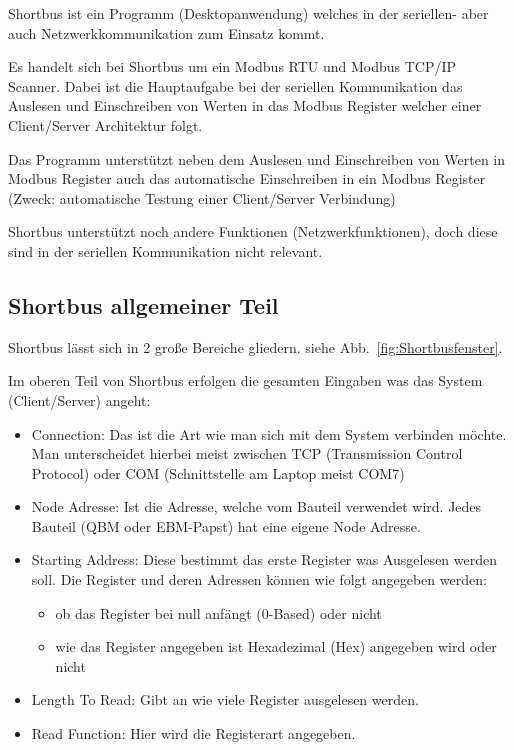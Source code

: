 Shortbus ist ein Programm (Desktopanwendung) welches in der seriellen- aber auch Netzwerkkommunikation zum Einsatz kommt. 

Es handelt sich bei Shortbus um ein Modbus RTU und Modbus TCP/IP Scanner.
Dabei ist die Hauptaufgabe bei der seriellen Kommunikation das Auslesen und Einschreiben von Werten in das Modbus Register welcher einer Client/Server Architektur folgt.


Das Programm unterstützt neben dem Auslesen und Einschreiben von Werten in Modbus Register auch das  automatische Einschreiben in ein Modbus Register (Zweck: automatische Testung einer Client/Server Verbindung)

Shortbus unterstützt noch andere Funktionen (Netzwerkfunktionen), doch diese sind in der seriellen Kommunikation nicht relevant. 
\cite[vgl.][]{software.informer:2024}

\subsection{Shortbus allgemeiner Teil}
Shortbus lässt sich in 2 große Bereiche gliedern. siehe Abb.~\ref{fig:Shortbusfenster}. 

Im oberen Teil von Shortbus erfolgen die gesamten Eingaben was das System (Client/Server) angeht:
\begin{itemize}
	\item Connection: Das ist die Art wie man sich mit dem System verbinden möchte. Man unterscheidet hierbei meist zwischen TCP (Transmission Control Protocol) oder COM (Schnittstelle am Laptop meist COM7)
	
	\item Node Adresse: Ist die Adresse, welche vom Bauteil verwendet wird. Jedes Bauteil (\zB QBM oder EBM-Papst) hat eine eigene Node Adresse.
	
	\item Starting Address: Diese bestimmt das erste Register was Ausgelesen werden soll. Die Register und deren Adressen können wie folgt angegeben werden:
		\begin{itemize}
			\item ob das Register bei null anfängt (0-Based) oder nicht
			\item wie das Register angegeben ist Hexadezimal (Hex) angegeben wird oder nicht
		\end{itemize}
	\item Length To Read: Gibt an wie viele Register ausgelesen werden. 
	\item Read Function: Hier wird die Registerart angegeben.
\end{itemize}


